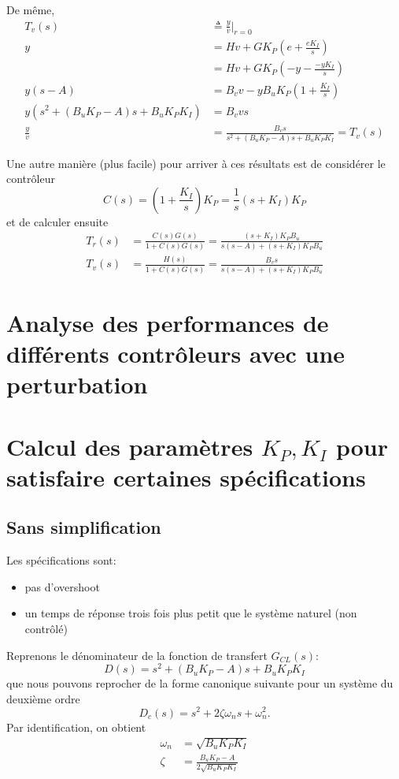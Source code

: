 \documentclass[frenchb, paper=a4, fontsize=11pt]{scrartcl}
\numberwithin{equation}{section}					%
\numberwithin{figure}{section}					%
\numberwithin{table}{section}						%
\begin{document}
De même,
\begin{align}
T_v(s) & \triangleq \frac{y}{v}\rvert_{r=0}\\
y &= H v+ G K_P (e+\frac{eK_I}{s})\\
&= H v + G K_P(-y-\frac{-yK_I}{s}) \\
y(s-A) &= B_v v - y B_u K_P (1+\frac{K_I}{s})\\
y(s^2 + (B_u K_P-A)s + B_u K_P K_I) &= B_v v s\\
\frac{y}{v} & = \frac{B_v s}{s^2 + (B_u K_P-A)s + B_u K_P K_I} = T_v(s)
\end{align}

Une autre manière (plus facile) pour arriver à ces résultats est de considérer le contrôleur 
\begin{equation}
C(s) = (1+\frac{K_I}{s})K_P = \frac{1}{s}(s+K_I)K_P
\end{equation}
et de calculer ensuite
\begin{align}
T_r(s) &= \frac{C(s)G(s)}{1+C(s)G(s)} = \frac{(s+K_I)K_P B_u}{s(s-A)+(s+K_I)K_P B_u}\\
T_v(s) &= \frac{H(s)}{1+C(s)G(s)} = \frac{B_v s}{s(s-A)+(s+K_I)K_P B_u}
\end{align}

\section{Analyse des performances de différents contrôleurs avec une perturbation}



\section{Calcul des paramètres $K_P,K_I$ pour satisfaire certaines spécifications}

\subsection{Sans simplification}
Les spécifications sont:
\begin{itemize}
\item pas d'overshoot
\item un temps de réponse trois fois plus petit que le système naturel (non contrôlé)
\end{itemize}

Reprenons le dénominateur de la fonction de transfert $G_{CL}(s)$:
\begin{equation}
D(s) = s^2 +(B_u K_P -A)s + B_u K_P K_I
\end{equation}
que nous pouvons reprocher de la forme canonique suivante pour un système du deuxième ordre
\begin{equation}
D_c(s) = s^2 + 2\zeta \omega_n s + \omega_n^2.
\end{equation}
Par identification, on obtient
\begin{align}
\omega_n &= \sqrt{B_u K_P K_I}\\
\zeta &= \frac{B_u K_P-A}{2\sqrt{B_u K_P K_I}}
\end{align}
\end{document}
